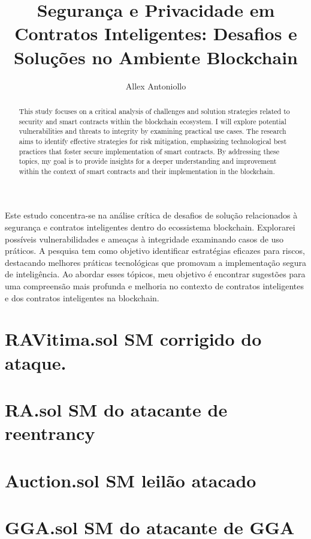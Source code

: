 \documentclass[portuguese,oneside]{UFFStex}
\author{Allex Antoniollo}
\title{Segurança e Privacidade em Contratos Inteligentes: Desafios e Soluções no Ambiente Blockchain}
      {Security and Privacy in Smart Contracts: Challenges and Solutions in the Blockchain Environment}
\begin{document}


\begin{resumo}
Este estudo concentra-se na análise crítica de desafios de solução relacionados à segurança e contratos inteligentes dentro do ecossistema blockchain. Explorarei possíveis vulnerabilidades e ameaças à integridade examinando casos de uso práticos. A pesquisa tem como objetivo identificar estratégias eficazes para riscos, destacando melhores práticas tecnológicas que promovam a implementação segura de inteligência. Ao abordar esses tópicos, meu objetivo é encontrar sugestões para uma compreensão mais profunda e melhoria no contexto de contratos inteligentes e dos contratos inteligentes na blockchain.
\end{resumo}

\begin{abstract}
This study focuses on a critical analysis of challenges and solution strategies related to security and smart contracts within the blockchain ecosystem. I will explore potential vulnerabilities and threats to integrity by examining practical use cases. The research aims to identify effective strategies for risk mitigation, emphasizing technological best practices that foster secure implementation of smart contracts. By addressing these topics, my goal is to provide insights for a deeper understanding and improvement within the context of smart contracts and their implementation in the blockchain.
\end{abstract}

\listoffigures
\listofacronyms
\tableofcontents








\anexos
\chapter{RAVitima.sol SM corrigido do ataque.}
\chapter{RA.sol SM do atacante de reentrancy}
\chapter{Auction.sol SM leilão atacado}
\chapter{GGA.sol SM do atacante de GGA}
\end{document}
